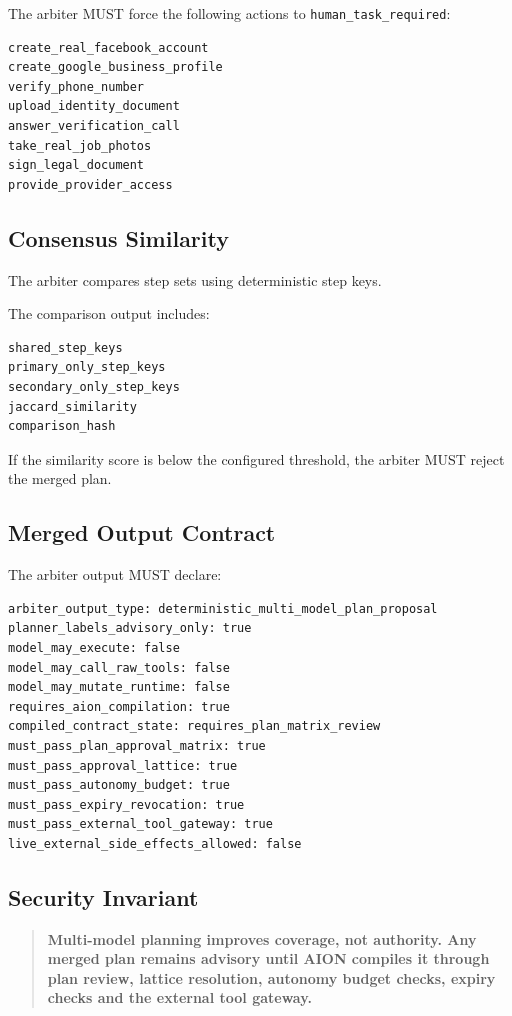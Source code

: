 The arbiter MUST force the following actions to \texttt{human\_task\_required}:

\begin{verbatim}
create_real_facebook_account
create_google_business_profile
verify_phone_number
upload_identity_document
answer_verification_call
take_real_job_photos
sign_legal_document
provide_provider_access
\end{verbatim}

\subsection{Consensus Similarity}

The arbiter compares step sets using deterministic step keys.

The comparison output includes:

\begin{verbatim}
shared_step_keys
primary_only_step_keys
secondary_only_step_keys
jaccard_similarity
comparison_hash
\end{verbatim}

If the similarity score is below the configured threshold, the arbiter MUST reject the merged plan.

\subsection{Merged Output Contract}

The arbiter output MUST declare:

\begin{verbatim}
arbiter_output_type: deterministic_multi_model_plan_proposal
planner_labels_advisory_only: true
model_may_execute: false
model_may_call_raw_tools: false
model_may_mutate_runtime: false
requires_aion_compilation: true
compiled_contract_state: requires_plan_matrix_review
must_pass_plan_approval_matrix: true
must_pass_approval_lattice: true
must_pass_autonomy_budget: true
must_pass_expiry_revocation: true
must_pass_external_tool_gateway: true
live_external_side_effects_allowed: false
\end{verbatim}

\subsection{Security Invariant}

\begin{quote}
\textbf{Multi-model planning improves coverage, not authority. Any merged plan remains advisory until AION compiles it through plan review, lattice resolution, autonomy budget checks, expiry checks and the external tool gateway.}
\end{quote}

